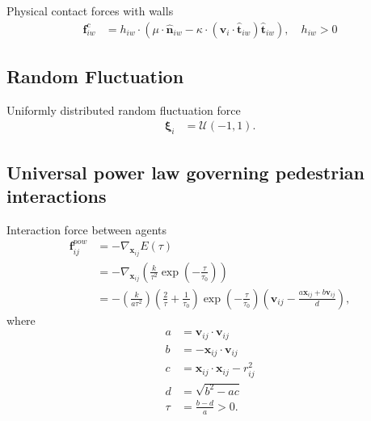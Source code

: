 Physical contact forces with walls
\begin{align}
\mathbf{f}_{iw}^{c} &= h_{iw} \cdot \left(\mu \cdot \hat{\mathbf{n}}_{iw} - \kappa \cdot (\mathbf{v}_{i} \cdot \hat{\mathbf{t}}_{iw}) \hat{\mathbf{t}}_{iw}\right), \quad h_{iw} > 0
\end{align}


\subsection{Random Fluctuation}
Uniformly distributed random fluctuation force
\begin{align}
\boldsymbol{\xi}_{i} &= \boldsymbol{\mathcal{U}}(-1, 1).
\end{align}



\subsection{Universal power law governing pedestrian interactions}
Interaction force between agents
\begin{align}
\mathbf{f}_{ij}^{pow} &= -\nabla_{\mathbf{x}_{ij}} E(\tau)  \\
&= -\nabla_{\mathbf{x}_{ij}} \left(\frac{k}{\tau^{2}} \exp \left( -\frac{\tau}{\tau_{0}} \right) \right) \\
&= - \left(\frac{k}{a \tau^{2}}\right) 
\left(\frac{2}{\tau} + \frac{1}{\tau_{0}}\right) 
\exp\left (-\frac{\tau}{\tau_{0}}\right )
\left(\mathbf{v}_{ij} -\frac{a \mathbf{x}_{ij} + b \mathbf{v}_{ij}}{d} \right),
\end{align}
where
\begin{align}
a &= \mathbf{v}_{ij} \cdot \mathbf{v}_{ij} \\
b &= -\mathbf{x}_{ij} \cdot \mathbf{v}_{ij} \\
c &= \mathbf{x}_{ij} \cdot \mathbf{x}_{ij} - r_{ij}^{2} \\
d &= \sqrt{b^{2} - a c} \\
\tau &= \frac{b - d}{a} > 0.
\end{align}
